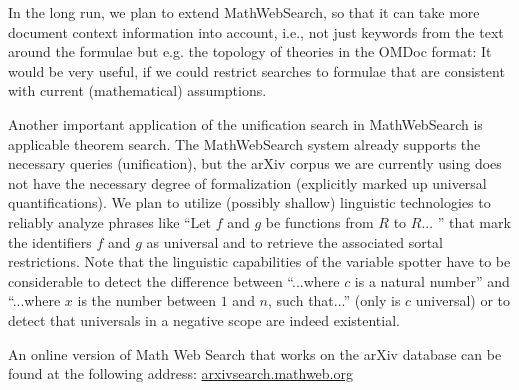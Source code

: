 \documentclass{deliverablereport}
\begin{document}
In the long run, we plan to extend MathWebSearch, so that it can take more document
context information into account, i.e., not just keywords from the text around the
formulae but e.g. the topology of theories in the OMDoc format: It would be very useful,
if we could restrict searches to formulae that are consistent with current (mathematical)
assumptions. 

Another important application of the unification search in MathWebSearch is applicable
theorem search. The MathWebSearch system already supports the necessary queries
(unification), but the arXiv corpus we are currently using does not have the necessary
degree of formalization (explicitly marked up universal quantifications). We plan to
utilize (possibly shallow) linguistic technologies to reliably analyze phrases like “Let
$f$ and $g$ be functions from $R$ to $R$... ” that mark the identifiers $f$ and $g$ as
universal and to retrieve the associated sortal restrictions. Note that the linguistic
capabilities of the variable spotter have to be considerable to detect the difference
between “...where $c$ is a natural number” and “...where $x$ is the number between $1$ and
$n$, such that...” (only is $c$ universal) or to detect that universals in a negative
scope are indeed existential.

An online version of Math Web Search that works on the arXiv database can be found at the
following address: \url{arxivsearch.mathweb.org}

\printbibliography
\end{document}
